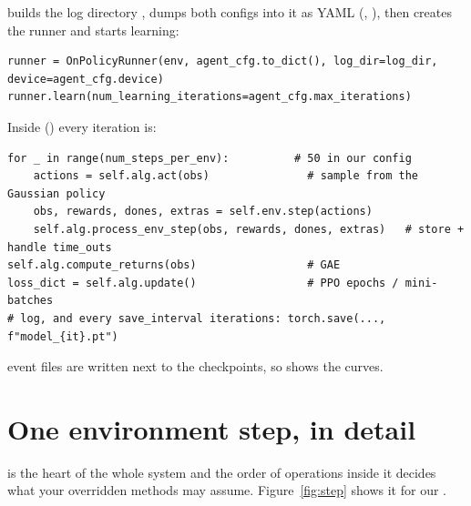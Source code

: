  builds the log directory
, dumps both configs
into it as YAML (, ), then
creates the runner and starts learning:

\begin{lstlisting}[numbers=none]
runner = OnPolicyRunner(env, agent_cfg.to_dict(), log_dir=log_dir, device=agent_cfg.device)
runner.learn(num_learning_iterations=agent_cfg.max_iterations)
\end{lstlisting}

Inside  () every
iteration is:

\begin{lstlisting}[numbers=none]
for _ in range(num_steps_per_env):          # 50 in our config
    actions = self.alg.act(obs)               # sample from the Gaussian policy
    obs, rewards, dones, extras = self.env.step(actions)
    self.alg.process_env_step(obs, rewards, dones, extras)   # store + handle time_outs
self.alg.compute_returns(obs)                 # GAE
loss_dict = self.alg.update()                 # PPO epochs / mini-batches
# log, and every save_interval iterations: torch.save(..., f"model_{it}.pt")
\end{lstlisting}

 event files are written next to the checkpoints, so
 shows the curves.

\section{One environment step, in detail}
\label{sec:step_detail}

 is the heart of the whole system and the order
of operations inside it decides what your overridden methods may assume.
Figure~\ref{fig:step} shows it for our .

